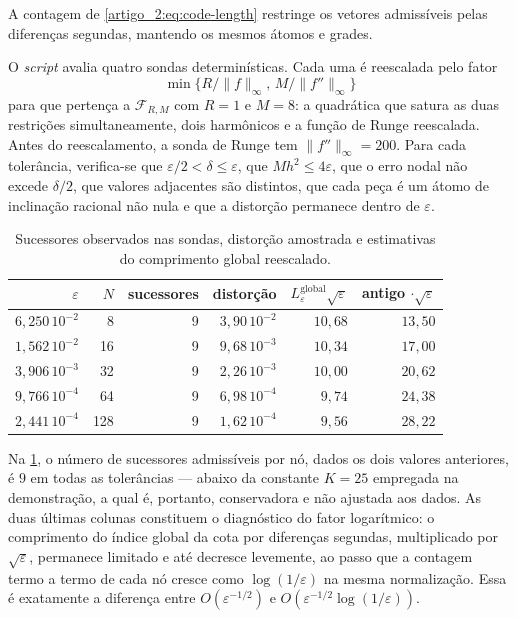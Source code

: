 \documentclass[12pt,a4paper]{article}
\theoremstyle{preciso}
\theoremstyle{definition}
\theoremstyle{preciso}
\theoremstyle{preciso}
\theoremstyle{preciso}
\theoremstyle{preciso}
\theoremstyle{definition}
\theoremstyle{preciso}
\theoremstyle{definition}
\theoremstyle{preciso}
\theoremstyle{preciso}
\theoremstyle{definition}
\begin{document}
A contagem de \eqref{artigo_2:eq:code-length} restringe os vetores admissíveis pelas diferenças segundas, mantendo os mesmos átomos e grades.

O \emph{script} avalia quatro sondas determinísticas. Cada uma é reescalada pelo fator
\[\min\{R/\|f\|_\infty,\,M/\|f''\|_\infty\}\]
para que pertença a
$\mathcal F_{R,M}$ com $R=1$ e $M=8$: a quadrática que satura as duas
restrições simultaneamente, dois harmônicos e a função de Runge reescalada.
Antes do reescalamento, a sonda de Runge tem $\|f''\|_\infty=200$. Para cada tolerância, verifica-se que
$\varepsilon/2<\delta\le\varepsilon$, que $Mh^2\le4\varepsilon$, que o erro
nodal não excede $\delta/2$, que valores adjacentes são distintos, que cada
peça é um átomo de inclinação racional não nula e que a distorção permanece dentro
de $\varepsilon$.

\begin{table}[t]
\centering
\caption{Sucessores observados nas sondas, distorção amostrada e estimativas do comprimento global reescalado.}
\label{artigo_2:tab:codebook-pt}
\small
\begin{tabular}{rrrrrr}
\toprule
$\varepsilon$ & $N$ & sucessores & distorção & $L_\varepsilon^{\mathrm{global}}\sqrt{\varepsilon}$ & antigo $\cdot\sqrt{\varepsilon}$\\
\midrule
$6{,}250\,10^{-2}$ & 8   & 9 & $3{,}90\,10^{-2}$ & $10{,}68$ & $13{,}50$\\
$1{,}562\,10^{-2}$ & 16  & 9 & $9{,}68\,10^{-3}$ & $10{,}34$ & $17{,}00$\\
$3{,}906\,10^{-3}$ & 32  & 9 & $2{,}26\,10^{-3}$ & $10{,}00$ & $20{,}62$\\
$9{,}766\,10^{-4}$ & 64  & 9 & $6{,}98\,10^{-4}$ & $9{,}74$  & $24{,}38$\\
$2{,}441\,10^{-4}$ & 128 & 9 & $1{,}62\,10^{-4}$ & $9{,}56$  & $28{,}22$\\
\bottomrule
\end{tabular}
\end{table}

Na \cref{artigo_2:tab:codebook-pt}, o número de sucessores
admissíveis por nó, dados os dois valores anteriores, é $9$ em todas as
tolerâncias --- abaixo da constante $K=25$ empregada na demonstração, a qual é,
portanto, conservadora e não ajustada aos dados. As duas últimas colunas constituem o
diagnóstico do fator logarítmico: o comprimento do índice global da cota por diferenças segundas,
multiplicado por $\sqrt{\varepsilon}$, permanece limitado e até decresce
levemente, ao passo que a contagem termo a termo de cada nó cresce
como $\log(1/\varepsilon)$ na mesma normalização. Essa é exatamente a diferença
entre $O(\varepsilon^{-1/2})$ e $O(\varepsilon^{-1/2}\log(1/\varepsilon))$.
\end{document}
